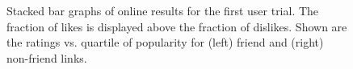 \begin{figure}[t!]
\centering
{}
\caption{Stacked bar graphs of online results for the first 
user trial.  The fraction of likes is displayed above the fraction of
dislikes.  Shown are the ratings vs. quartile of popularity for (left)
friend and (right) non-friend links.}
\label{fig:popularity}
\end{figure}

